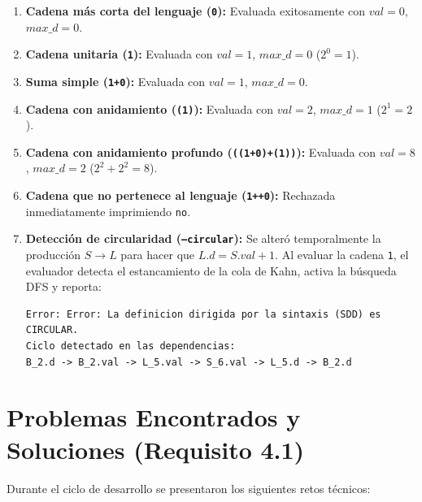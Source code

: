 \documentclass[11pt,a4paper]{article}
\begin{document}
\begin{enumerate}
    \item \textbf{Cadena más corta del lenguaje (\texttt{0}):} Evaluada exitosamente con $val = 0$, $max\_d = 0$.
    \item \textbf{Cadena unitaria (\texttt{1}):} Evaluada con $val = 1$, $max\_d = 0$ ($2^0 = 1$).
    \item \textbf{Suma simple (\texttt{1+0}):} Evaluada con $val = 1$, $max\_d = 0$.
    \item \textbf{Cadena con anidamiento (\texttt{(1)}):} Evaluada con $val = 2$, $max\_d = 1$ ($2^1 = 2$).
    \item \textbf{Cadena con anidamiento profundo (\texttt{((1+0)+(1))}):} Evaluada con $val = 8$, $max\_d = 2$ ($2^2 + 2^2 = 8$).
    \item \textbf{Cadena que no pertenece al lenguaje (\texttt{1++0}):} Rechazada inmediatamente imprimiendo \texttt{no}.
    \item \textbf{Detección de circularidad (\texttt{--circular}):} Se alteró temporalmente la producción $S \rightarrow L$ para hacer que $L.d = S.val + 1$. Al evaluar la cadena \texttt{1}, el evaluador detecta el estancamiento de la cola de Kahn, activa la búsqueda DFS y reporta:
    \begin{lstlisting}
Error: Error: La definicion dirigida por la sintaxis (SDD) es CIRCULAR.
Ciclo detectado en las dependencias:
B_2.d -> B_2.val -> L_5.val -> S_6.val -> L_5.d -> B_2.d
    \end{lstlisting}
\end{enumerate}

\newpage
\section{Problemas Encontrados y Soluciones (Requisito 4.1)}

Durante el ciclo de desarrollo se presentaron los siguientes retos técnicos:
\end{document}
